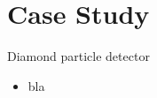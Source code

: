\section{Case Study}
\begin{frame}{Diamond particle detector}
%
  \begin{itemize}\itemfill
    \item bla
  \end{itemize}
%
\end{frame}
